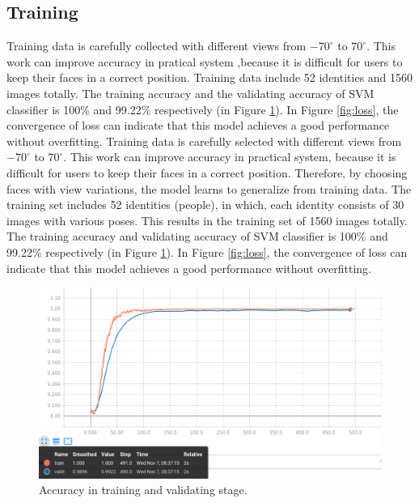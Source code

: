 \documentclass[journal, twocolumn]{IEEEtran}
\begin{document}
\subsection{Training}
Training data is carefully collected with different views from $-70^\circ$ to $70^\circ$. This work can improve accuracy in pratical system ,because it is difficult for users to keep their faces in a correct position. Training data include 52 identities and 1560 images totally. The training accuracy and the validating accuracy of SVM classifier is 100\% and 99.22\% respectively (in Figure \ref{fig:acc}). In Figure \ref{fig:loss}, the convergence of loss can indicate that this model achieves a good performance without overfitting. 
Training data is carefully selected with different views from $-70^\circ$ to $70^\circ$. This work can improve accuracy in practical system, because it is difficult for users to keep their faces in a correct position. Therefore, by choosing faces with view variations, the model learns to generalize from training data. The training set includes 52 identities (people), in which, each identity consists of 30 images with various poses. This results in the training set of 1560 images totally. The training accuracy and validating accuracy of SVM classifier is 100\% and 99.22\% respectively (in Figure \ref{fig:acc}). In Figure \ref{fig:loss}, the convergence of loss can indicate that this model achieves a good performance without overfitting.
\begin{figure}
    \centering
    \includegraphics[width=1\linewidth]{img/acc.png}
	\caption{Accuracy in training and validating stage.}
	\label{fig:acc}
\end{figure}
\end{document}
